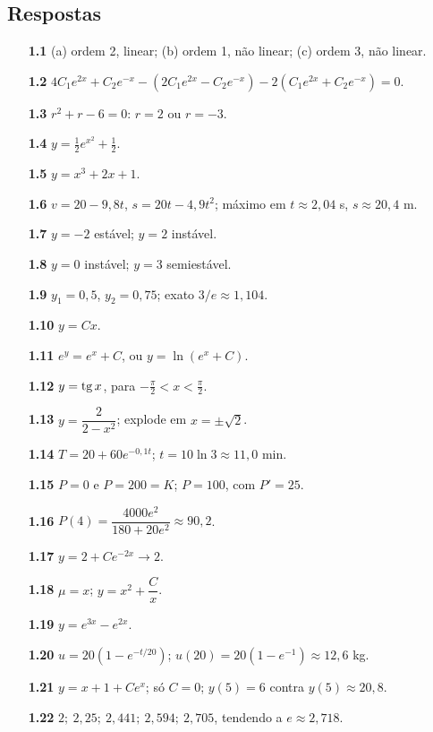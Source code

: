 \subsection*{Respostas}
{\small\begin{multicols}{2}\raggedright
\begin{itemize}[leftmargin=2.7em,labelsep=0.5em,itemsep=1pt]
\item[\textbf{1.1}] (a) ordem 2, linear; (b) ordem 1, não linear; (c) ordem 3, não linear.
\item[\textbf{1.2}] $4C_1e^{2x}+C_2e^{-x}-(2C_1e^{2x}-C_2e^{-x})-2(C_1e^{2x}+C_2e^{-x})=0$.
\item[\textbf{1.3}] $r^2+r-6=0$: $r=2$ ou $r=-3$.
\item[\textbf{1.4}] $y=\tfrac12e^{x^2}+\tfrac12$.
\item[\textbf{1.5}] $y=x^3+2x+1$.
\item[\textbf{1.6}] $v=20-9{,}8t$, $s=20t-4{,}9t^2$; máximo em $t\approx2{,}04$ s, $s\approx20{,}4$ m.
\item[\textbf{1.7}] $y=-2$ estável; $y=2$ instável.
\item[\textbf{1.8}] $y=0$ instável; $y=3$ semiestável.
\item[\textbf{1.9}] $y_1=0{,}5$, $y_2=0{,}75$; exato $3/e\approx1{,}104$.
\item[\textbf{1.10}] $y=Cx$.
\item[\textbf{1.11}] $e^y=e^x+C$, ou $y=\ln(e^x+C)$.
\item[\textbf{1.12}] $y=\operatorname{tg} x$, para $-\tfrac\pi2<x<\tfrac\pi2$.
\item[\textbf{1.13}] $y=\dfrac2{2-x^2}$; explode em $x=\pm\sqrt2$.
\item[\textbf{1.14}] $T=20+60e^{-0{,}1t}$; $t=10\ln3\approx11{,}0$ min.
\item[\textbf{1.15}] $P=0$ e $P=200=K$; $P=100$, com $P'=25$.
\item[\textbf{1.16}] $P(4)=\dfrac{4000e^2}{180+20e^2}\approx90{,}2$.
\item[\textbf{1.17}] $y=2+Ce^{-2x}\to2$.
\item[\textbf{1.18}] $\mu=x$; $y=x^2+\dfrac Cx$.
\item[\textbf{1.19}] $y=e^{3x}-e^{2x}$.
\item[\textbf{1.20}] $u=20(1-e^{-t/20})$; $u(20)=20(1-e^{-1})\approx12{,}6$ kg.
\item[\textbf{1.21}] $y=x+1+Ce^x$; só $C=0$; $y(5)=6$ contra $y(5)\approx20{,}8$.
\item[\textbf{1.22}] $2;\ 2{,}25;\ 2{,}441;\ 2{,}594;\ 2{,}705$, tendendo a $e\approx2{,}718$.

\end{itemize}
\end{multicols}}
